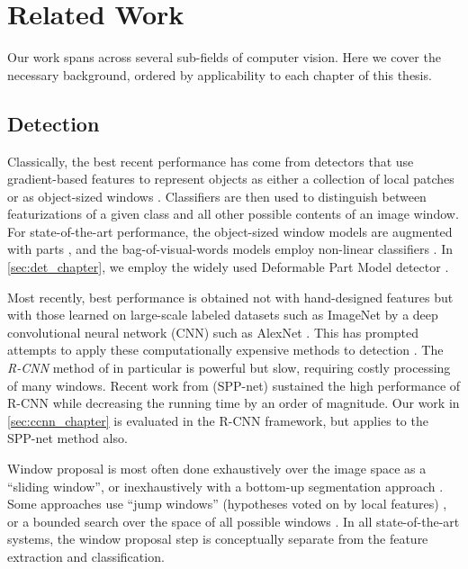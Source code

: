 \section{Related Work}\label{sec:related_work}

Our work spans across several sub-fields of computer vision.
Here we cover the necessary background, ordered by applicability to each chapter of this thesis.

\subsection{Detection}

Classically, the best recent performance has come from detectors that use gradient-based features to represent objects as either a collection of local patches or as object-sized windows \parencite{Dalal2005,Lowe2004}.
Classifiers are then used to distinguish between featurizations of a given class and all other possible contents of an image window.
For state-of-the-art performance, the object-sized window models are augmented with parts \parencite{Felzenszwalb2010a}, and the bag-of-visual-words models employ non-linear classifiers \parencite{Vedaldi2009}.
In \autoref{sec:det_chapter}, we employ the widely used Deformable Part Model detector \parencite{Felzenszwalb2010a}.

Most recently, best performance is obtained not with hand-designed features but with those learned on large-scale labeled datasets such as ImageNet \parencite{Deng-CVPR-2009} by a deep convolutional neural network (CNN) such as AlexNet \parencite{Krizhevsky-NIPS-2012}.
This has prompted attempts to apply these computationally expensive methods to detection \parencite{Erhan-CVPR-2014,Sermanet-ICLR-2014}.
The \emph{R-CNN} method of \cite{Girshick-CVPR-2014} in particular is powerful but slow, requiring costly processing of many windows.
Recent work from \cite{He-ECCV-2014} (SPP-net) sustained the high performance of R-CNN while decreasing the running time by an order of magnitude.
Our work in \autoref{sec:ccnn_chapter} is evaluated in the R-CNN framework, but applies to the SPP-net method also.

Window proposal is most often done exhaustively over the image space as a ``sliding window'', or inexhaustively with a bottom-up segmentation approach \parencite{Uijlings-IJCV-2013}.
Some approaches use ``jump windows'' (hypotheses voted on by local features) \parencite{Vedaldi2009,Vijayanarasimhan2011}, or a bounded search over the space of all possible windows \parencite{Lampert2008a}.
In all state-of-the-art systems, the window proposal step is conceptually separate from the feature extraction and classification.

